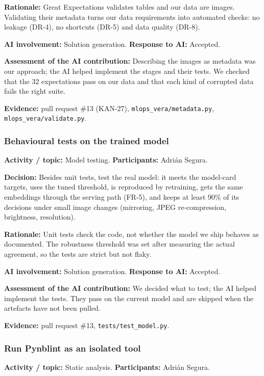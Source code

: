 \documentclass[11pt]{article}
\begin{document}
\noindent\textbf{Rationale:} Great Expectations validates tables and our data are images. Validating their metadata turns our data requirements into automated checks: no leakage (DR-4), no shortcuts (DR-5) and data quality (DR-8).

\noindent\textbf{AI involvement:} Solution generation. \textbf{Response to AI:} Accepted.

\noindent\textbf{Assessment of the AI contribution:} Describing the images as metadata was our approach; the AI helped implement the stages and their tests. We checked that the 32 expectations pass on our data and that each kind of corrupted data fails the right suite.

\noindent\textbf{Evidence:} pull request \#13 (KAN-27), \texttt{mlops\_vera/metadata.py}, \texttt{mlops\_vera/validate.py}.

\subsubsection{Behavioural tests on the trained model}
\noindent\textbf{Activity / topic:} Model testing. \textbf{Participants:} Adri\'an Segura.

\noindent\textbf{Decision:} Besides unit tests, test the real model: it meets the model-card targets, uses the tuned threshold, is reproduced by retraining, gets the same embeddings through the serving path (FR-5), and keeps at least 90\% of its decisions under small image changes (mirroring, JPEG re-compression, brightness, resolution).

\noindent\textbf{Rationale:} Unit tests check the code, not whether the model we ship behaves as documented. The robustness threshold was set after measuring the actual agreement, so the tests are strict but not flaky.

\noindent\textbf{AI involvement:} Solution generation. \textbf{Response to AI:} Accepted.

\noindent\textbf{Assessment of the AI contribution:} We decided what to test; the AI helped implement the tests. They pass on the current model and are skipped when the artefacts have not been pulled.

\noindent\textbf{Evidence:} pull request \#13, \texttt{tests/test\_model.py}.

\subsubsection{Run Pynblint as an isolated tool}
\noindent\textbf{Activity / topic:} Static analysis. \textbf{Participants:} Adri\'an Segura.
\end{document}
